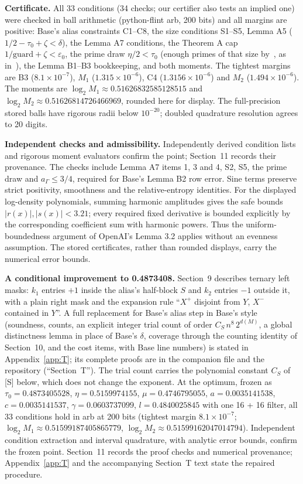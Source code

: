 \documentclass[11pt]{article}
\newcommand{\eps}{\varepsilon}
\theoremstyle{plain}
\begin{document}
\textbf{Certificate.} All 33 conditions (34 checks; our certifier also tests an implied one) were checked in ball arithmetic (python-flint arb, 200 bits) and all margins are positive: Base's alias constraints C1--C8, the size conditions S1--S5, Lemma A5 ($1/2 - \tau_0 + \zeta < \delta$), the Lemma A7 conditions, the Theorem A cap $1/\mathrm{guard} + \zeta < \eps_0$, the prime draw $\eta/2 < \tau_0$ (enough primes of that size by~\cite[Cor.~3]{rs}, as in~\cite{openai}), the Lemma B1--B3 bookkeeping, and both moments. The tightest margins are B3 ($8.1\times10^{-7}$), $M_1$ ($1.315\times10^{-6}$), C4 ($1.3156\times10^{-6}$) and $M_2$ ($1.494\times10^{-6}$). The moments are $\log_2 M_1\approx0.51626832585128515$ and $\log_2 M_2\approx0.51626814726466969$, rounded here for display. The full-precision stored balls have rigorous radii below $10^{-20}$; doubled quadrature resolution agrees to 20 digits.

\textbf{Independent checks and admissibility.} Independently derived condition lists and rigorous moment evaluators confirm the point; Section~11 records their provenance. The checks include Lemma A7 items 1, 3 and 4, S2, S5, the prime draw and $a_\Gamma\le3/4$, required for Base's Lemma B2 row error. Sine terms preserve strict positivity, smoothness and the relative-entropy identities. For the displayed log-density polynomials, summing harmonic amplitudes gives the safe bounds $|r(x)|,|s(x)|<3.21$; every required fixed derivative is bounded explicitly by the corresponding coefficient sum with harmonic powers. Thus the uniform-boundedness argument of OpenAI's Lemma 3.2 applies without an evenness assumption. The stored certificates, rather than rounded displays, carry the numerical error bounds.

\textbf{A conditional improvement to 0.4873408.} Section~9 describes ternary left masks: $k_1$ entries $+1$ inside the alias's half-block $S$ and $k_2$ entries $-1$ outside it, with a plain right mask and the expansion rule ``$X^+$ disjoint from $Y$, $X^-$ contained in $Y$''. A full replacement for Base's alias step in Base's style (soundness, counts, an explicit integer trial count of order $C_S\, n^8\, 2^{d(M)}$, a global distinctness lemma in place of Base's $\delta$, coverage through the counting identity of Section~10, and the cost items, with Base line numbers) is stated in Appendix~\ref{app:T}; its complete proofs are in the companion file  and the repository (``Section~T''). The trial count carries the polynomial constant $C_S$ of [S] below, which does not change the exponent. At the optimum, frozen as $\tau_0 = 0.4873405528$, $\eta = 0.5159974155$, $\mu = 0.4746795055$, $a = 0.0035141538$, $c = 0.0035141537$, $\gamma = 0.0603737099$, $l = 0.4840025845$ with one 16 + 16 filter, all 33 conditions hold in arb at 200 bits (tightest margin $8.1\times10^{-7}$; $\log_2 M_1\approx0.51599187405865779$, $\log_2 M_2\approx0.51599162047014794$). Independent condition extraction and interval quadrature, with analytic error bounds, confirm the frozen point. Section~11 records the proof checks and numerical provenance; Appendix~\ref{app:T} and the accompanying Section~T text state the repaired procedure.
\end{document}
